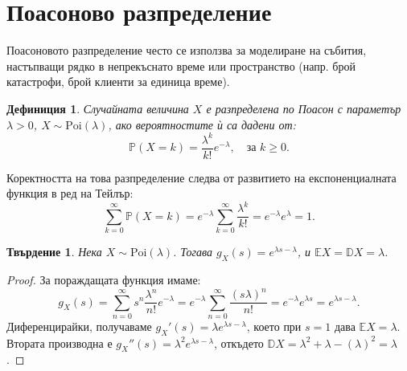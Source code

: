 \documentclass{article}
\newtheorem{theorem}{Твърдение}
\newtheorem{definition}{Дефиниция}
\begin{document}
\section{Поасоново разпределение}

Поасоновото разпределение често се използва за моделиране на събития, настъпващи рядко в непрекъснато време или пространство (напр. брой катастрофи, брой клиенти за единица време).

\begin{definition}
Случайната величина $X$ е разпределена по Поасон с параметър $\lambda > 0$, $X \sim \text{Poi}(\lambda)$, ако вероятностите ѝ са дадени от:
\[ \mathbb{P}(X=k) = \frac{\lambda^k}{k!} e^{-\lambda}, \quad \text{за } k \ge 0. \]
\end{definition}
Коректността на това разпределение следва от развитието на експоненциалната функция в ред на Тейлър:
\[ \sum_{k=0}^{\infty} \mathbb{P}(X=k) = e^{-\lambda} \sum_{k=0}^{\infty} \frac{\lambda^k}{k!} = e^{-\lambda} e^{\lambda} = 1. \]

\begin{theorem}
Нека $X \sim \text{Poi}(\lambda)$. Тогава $g_X(s) = e^{\lambda s - \lambda}$, и $\mathbb{E}X = \mathbb{D}X = \lambda$.
\end{theorem}
\begin{proof}
За пораждащата функция имаме:
\[ g_X(s) = \sum_{n=0}^{\infty} s^n \frac{\lambda^n}{n!} e^{-\lambda} = e^{-\lambda} \sum_{n=0}^{\infty} \frac{(s\lambda)^n}{n!} = e^{-\lambda} e^{\lambda s} = e^{\lambda s - \lambda}. \]
Диференцирайки, получаваме $g_X'(s) = \lambda e^{\lambda s - \lambda}$, което при $s=1$ дава $\mathbb{E}X = \lambda$. 
Втората производна е $g_X''(s) = \lambda^2 e^{\lambda s - \lambda}$, откъдето $\mathbb{D}X = \lambda^2 + \lambda - (\lambda)^2 = \lambda$.
\end{proof}
\end{document}

